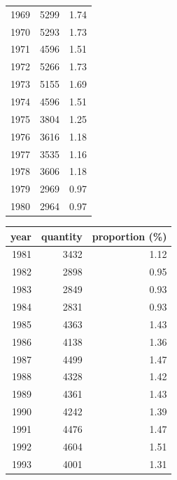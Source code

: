 \begin{description}
\begin{table}[!htb]
\begin{minipage}{.45\linewidth}
\begin{tabular}{rrr}
         1969 &    5299 &             1.74 \\
         1970 &    5293 &             1.73 \\
         1971 &    4596 &             1.51 \\
         1972 &    5266 &             1.73 \\
         1973 &    5155 &             1.69 \\
         1974 &    4596 &             1.51 \\
         1975 &    3804 &             1.25 \\
         1976 &    3616 &             1.18 \\
         1977 &    3535 &             1.16 \\
         1978 &    3606 &             1.18 \\
          1979 &    2969 &             0.97 \\
         1980 &    2964 &             0.97 \\
        \hline
        \end{tabular}
        \end{minipage}
        \begin{minipage}{.45\linewidth}
        \centering
        \begin{tabular}{rrr}
        \hline
            \textbf{year} &   \textbf{quantity} &   \textbf{proportion (\%)} \\
        \hline
         1981 &    3432 &             1.12 \\
         1982 &    2898 &             0.95 \\
         1983 &    2849 &             0.93 \\
         1984 &    2831 &             0.93 \\
         1985 &    4363 &             1.43 \\
         1986 &    4138 &             1.36 \\
         1987 &    4499 &             1.47 \\
         1988 &    4328 &             1.42 \\
         1989 &    4361 &             1.43 \\
         1990 &    4242 &             1.39 \\
         1991 &    4476 &             1.47 \\
         1992 &    4604 &             1.51 \\
         1993 &    4001 &             1.31 \\

\end{tabular}
\end{minipage}
\end{table}
\end{description}
